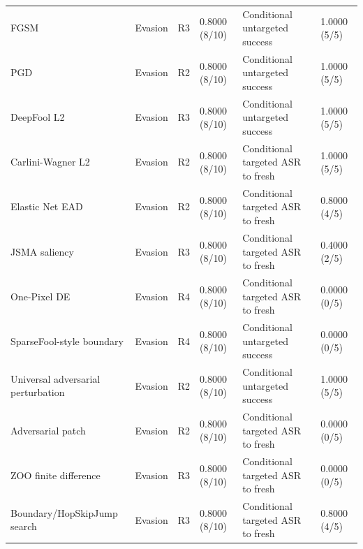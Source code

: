 ﻿\documentclass[6p,10pt,times]{ieeeaccess}
\begin{document}
\begin{table}[t]
\begin{tabular}{p{}p{}p{}p{}p{}p{}}
FGSM & Evasion & R3 & 0.8000 (8/10) & Conditional untargeted success & 1.0000 (5/5) \\
PGD & Evasion & R2 & 0.8000 (8/10) & Conditional untargeted success & 1.0000 (5/5) \\
DeepFool L2 & Evasion & R3 & 0.8000 (8/10) & Conditional untargeted success & 1.0000 (5/5) \\
Carlini-Wagner L2 & Evasion & R2 & 0.8000 (8/10) & Conditional targeted ASR to fresh & 1.0000 (5/5) \\
Elastic Net EAD & Evasion & R2 & 0.8000 (8/10) & Conditional targeted ASR to fresh & 0.8000 (4/5) \\
JSMA saliency & Evasion & R3 & 0.8000 (8/10) & Conditional targeted ASR to fresh & 0.4000 (2/5) \\
One-Pixel DE & Evasion & R4 & 0.8000 (8/10) & Conditional targeted ASR to fresh & 0.0000 (0/5) \\
SparseFool-style boundary & Evasion & R4 & 0.8000 (8/10) & Conditional untargeted success & 0.0000 (0/5) \\
Universal adversarial perturbation & Evasion & R2 & 0.8000 (8/10) & Conditional untargeted success & 1.0000 (5/5) \\
Adversarial patch & Evasion & R2 & 0.8000 (8/10) & Conditional targeted ASR to fresh & 0.0000 (0/5) \\
ZOO finite difference & Evasion & R3 & 0.8000 (8/10) & Conditional targeted ASR to fresh & 0.0000 (0/5) \\
Boundary/HopSkipJump search & Evasion & R3 & 0.8000 (8/10) & Conditional targeted ASR to fresh & 0.8000 (4/5) \\
\bottomrule
\end{tabular}
\end{table}
\end{document}
